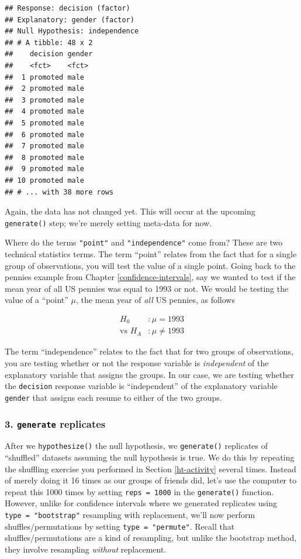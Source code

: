 \documentclass[
]{book}
\begin{document}
\begin{verbatim}
## Response: decision (factor)
## Explanatory: gender (factor)
## Null Hypothesis: independence
## # A tibble: 48 x 2
##    decision gender
##    <fct>    <fct> 
##  1 promoted male  
##  2 promoted male  
##  3 promoted male  
##  4 promoted male  
##  5 promoted male  
##  6 promoted male  
##  7 promoted male  
##  8 promoted male  
##  9 promoted male  
## 10 promoted male  
## # ... with 38 more rows
\end{verbatim}

Again, the data has not changed yet. This will occur at the upcoming \texttt{generate()} step; we're merely setting meta-data for now.

Where do the terms \texttt{"point"} and \texttt{"independence"} come from? These are two technical statistics terms. The term ``point'' relates from the fact that for a single group of observations, you will test the value of a single point. Going back to the pennies example from Chapter \ref{confidence-intervals}, say we wanted to test if the mean year of all US pennies was equal to 1993 or not. We would be testing the value of a ``point'' \(\mu\), the mean year of \emph{all} US pennies, as follows

\[
\begin{aligned}
H_0 &: \mu = 1993\\
\text{vs } H_A&: \mu \neq 1993
\end{aligned}
\]

The term ``independence'' relates to the fact that for two groups of observations, you are testing whether or not the response variable is \emph{independent} of the explanatory variable that assigns the groups. In our case, we are testing whether the \texttt{decision} response variable is ``independent'' of the explanatory variable \texttt{gender} that assigns each resume to either of the two groups.

\hypertarget{generate-replicates}{%
\subsubsection*{\texorpdfstring{3. \texttt{generate} replicates}{3. generate replicates}}\label{generate-replicates}}

After we \texttt{hypothesize()} the null hypothesis, we \texttt{generate()} replicates of ``shuffled'' datasets assuming the null hypothesis is true. We do this by repeating the shuffling exercise you performed in Section \ref{ht-activity} several times. Instead of merely doing it 16 times as our groups of friends did, let's use the computer to repeat this 1000 times by setting \texttt{reps\ =\ 1000} in the \texttt{generate()}  function. However, unlike for confidence intervals where we generated replicates using \texttt{type\ =\ "bootstrap"} resampling with replacement, we'll now perform shuffles/permutations by setting \texttt{type\ =\ "permute"}. Recall that shuffles/permutations are a kind of resampling, but unlike the bootstrap method, they involve resampling \emph{without} replacement.
\end{document}
